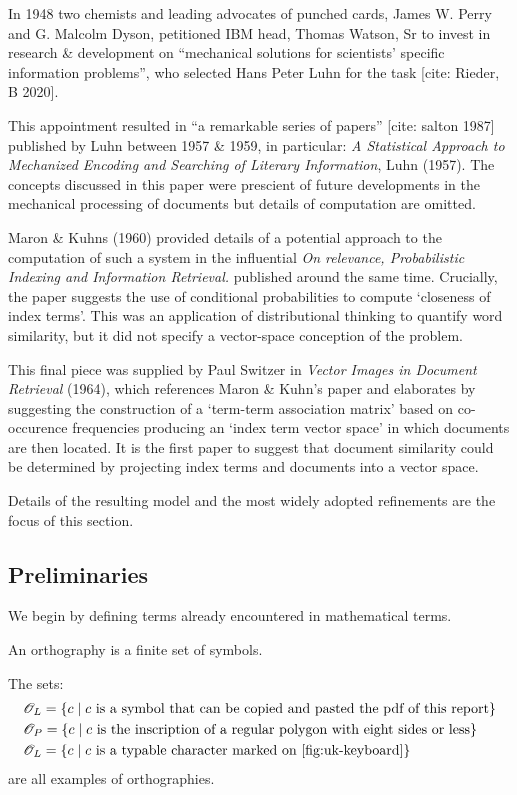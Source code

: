 In 1948 two chemists and leading advocates of punched cards, James W. Perry and G. Malcolm Dyson, petitioned IBM head, Thomas Watson, Sr to invest in research \& development on ``mechanical solutions for scientists’ specific information problems'', who selected Hans Peter Luhn for the task [cite: Rieder, B 2020].

This appointment resulted in ``a remarkable series of papers'' [cite: salton 1987] published by Luhn between 1957 \& 1959, in particular: \emph{A Statistical Approach to Mechanized Encoding and Searching of Literary Information}, Luhn (1957). The concepts discussed in this paper were prescient of future developments in the mechanical processing of documents but details of computation are omitted.

Maron \& Kuhns (1960) provided details of a potential approach to the computation of such a system in the influential \emph{On relevance, Probabilistic Indexing and Information Retrieval.} published around the same time. Crucially, the paper suggests the use of conditional probabilities to compute `closeness of index terms'. This was an application of distributional thinking to quantify word similarity, but it did not specify a vector-space conception of the problem.

This final piece was supplied by Paul Switzer in \emph{Vector Images in Document Retrieval} (1964), which references Maron \& Kuhn's paper and elaborates by suggesting the construction of a `term-term association matrix' based on co-occurence frequencies producing an `index term vector space' in which documents are then located. It is the first paper to suggest that document similarity could be determined by projecting index terms and documents into a vector space.


Details of the resulting model and the most widely adopted refinements are the focus of this section.

\subsection{Preliminaries}
We begin by defining terms already encountered in mathematical terms.

\begin{definition}[Orthography]\label{def:orthography}
  An orthography is a finite set of symbols.
\end{definition}

\begin{example}\label{ex:orthographies}
  The sets:
  \begin{align}
    &\mathscr{O}_L=\{c\mid\text{$c$ is a symbol that can be copied and pasted the pdf of this report}\}\label{eq:orth-doc}\\
    &\mathscr{O}_P=\{c\mid\text{$c$ is the inscription of a regular polygon with eight sides or less}\}\label{eq:orth-shape}\\
    &\mathscr{O}_L=\{c\mid\text{$c$ is a typable character marked on \autoref{fig:uk-keyboard}}\}\label{eq:orth-keyboard}
  \end{align}
  are all examples of orthographies.
\end{example}
\vspace{6pt}

